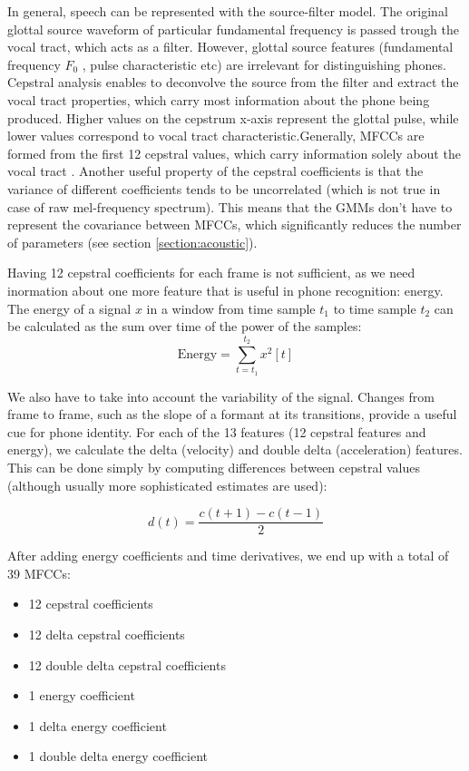 In general, speech can be represented with the source-filter model. The original glottal source waveform of particular fundamental frequency is passed trough the vocal tract, which acts as a filter. However, glottal source features (fundamental frequency $F_{0}$ , pulse characteristic etc) are irrelevant for distinguishing phones. Cepstral analysis enables to deconvolve the source from the filter and extract the vocal tract properties, which carry most information about the phone being produced. Higher values on the cepstrum x-axis represent the glottal pulse, while lower values correspond to vocal tract characteristic.Generally, MFCCs are formed from the first 12 cepstral values, which carry information solely about the vocal tract  \cite{jurafsky2000speech}. Another useful property of the cepstral coefficients is that the variance of different coefficients tends to be uncorrelated (which is not true in case of raw mel-frequency spectrum). This means that the GMMs don't have to represent the covariance between MFCCs, which significantly reduces the number of parameters (see section \ref{section:acoustic}).

Having 12 cepstral coefficients for each frame is not sufficient, as we need inormation about one more feature that is useful in phone recognition: energy. The energy of a signal $x$ in a window from time sample $t_{1}$ to time sample $t_{2}$ can be calculated as the sum over time of the power of the samples:
\begin{equation}
  \text{Energy}=\sum_{t=t_{1}}^{t_{2}}x^{2}[t]
\end{equation}

We also have to take into account the variability of the signal. Changes from frame to frame, such as the slope of a formant at its transitions, provide a useful cue for phone identity. For each of the 13 features (12 cepstral features and energy), we calculate the delta (velocity) and double delta (acceleration) features. This can be done simply by computing differences between cepstral values (although usually more sophisticated estimates are used):

\begin{equation}
  d(t)=\frac{c(t+1)-c(t-1)}{2}
\end{equation}

After adding energy coefficients and time derivatives, we end up with a total of 39 MFCCs:
\begin{itemize}
\itemsep0em
\item 12 cepstral coefficients
\item 12 delta cepstral coefficients
\item 12 double delta cepstral coefficients
\item 1 energy coefficient
\item 1 delta energy coefficient
\item 1 double delta energy coefficient
\end{itemize}


